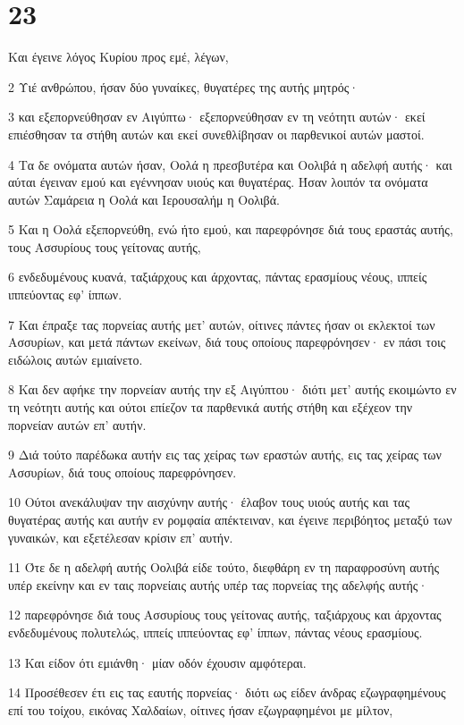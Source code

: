 \chapter{23}

\par Και έγεινε λόγος Κυρίου προς εμέ, λέγων,
\par 2 Υιέ ανθρώπου, ήσαν δύο γυναίκες, θυγατέρες της αυτής μητρός·
\par 3 και εξεπορνεύθησαν εν Αιγύπτω· εξεπορνεύθησαν εν τη νεότητι αυτών· εκεί επιέσθησαν τα στήθη αυτών και εκεί συνεθλίβησαν οι παρθενικοί αυτών μαστοί.
\par 4 Τα δε ονόματα αυτών ήσαν, Οολά η πρεσβυτέρα και Οολιβά η αδελφή αυτής· και αύται έγειναν εμού και εγέννησαν υιούς και θυγατέρας. Ήσαν λοιπόν τα ονόματα αυτών Σαμάρεια η Οολά και Ιερουσαλήμ η Οολιβά.
\par 5 Και η Οολά εξεπορνεύθη, ενώ ήτο εμού, και παρεφρόνησε διά τους εραστάς αυτής, τους Ασσυρίους τους γείτονας αυτής,
\par 6 ενδεδυμένους κυανά, ταξιάρχους και άρχοντας, πάντας ερασμίους νέους, ιππείς ιππεύοντας εφ' ίππων.
\par 7 Και έπραξε τας πορνείας αυτής μετ' αυτών, οίτινες πάντες ήσαν οι εκλεκτοί των Ασσυρίων, και μετά πάντων εκείνων, διά τους οποίους παρεφρόνησεν· εν πάσι τοις ειδώλοις αυτών εμιαίνετο.
\par 8 Και δεν αφήκε την πορνείαν αυτής την εξ Αιγύπτου· διότι μετ' αυτής εκοιμώντο εν τη νεότητι αυτής και ούτοι επίεζον τα παρθενικά αυτής στήθη και εξέχεον την πορνείαν αυτών επ' αυτήν.
\par 9 Διά τούτο παρέδωκα αυτήν εις τας χείρας των εραστών αυτής, εις τας χείρας των Ασσυρίων, διά τους οποίους παρεφρόνησεν.
\par 10 Ούτοι ανεκάλυψαν την αισχύνην αυτής· έλαβον τους υιούς αυτής και τας θυγατέρας αυτής και αυτήν εν ρομφαία απέκτειναν, και έγεινε περιβόητος μεταξύ των γυναικών, και εξετέλεσαν κρίσιν επ' αυτήν.
\par 11 Ότε δε η αδελφή αυτής Οολιβά είδε τούτο, διεφθάρη εν τη παραφροσύνη αυτής υπέρ εκείνην και εν ταις πορνείαις αυτής υπέρ τας πορνείας της αδελφής αυτής·
\par 12 παρεφρόνησε διά τους Ασσυρίους τους γείτονας αυτής, ταξιάρχους και άρχοντας ενδεδυμένους πολυτελώς, ιππείς ιππεύοντας εφ' ίππων, πάντας νέους ερασμίους.
\par 13 Και είδον ότι εμιάνθη· μίαν οδόν έχουσιν αμφότεραι.
\par 14 Προσέθεσεν έτι εις τας εαυτής πορνείας· διότι ως είδεν άνδρας εζωγραφημένους επί του τοίχου, εικόνας Χαλδαίων, οίτινες ήσαν εζωγραφημένοι με μίλτον,
